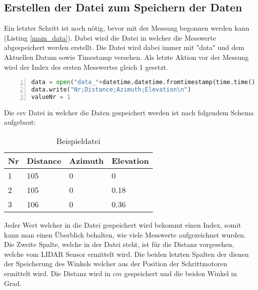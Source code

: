 \subsection{Erstellen der Datei zum Speichern der Daten}
Ein letzter Schritt ist noch nötig, bevor mit der Messung begonnen werden kann (Listing \ref{main_data}). Dabei wird die Datei in welcher die Messwerte abgespeichert werden erstellt. Die Datei wird dabei immer mit "data" und dem Aktuellen Datum sowie Timestamp versehen. Als letzte Aktion vor der Messung wird der Index des ersten Messwertes gleich 1 gesetzt.\\
\begin{lstlisting}[caption={Erstellen der Datei zum Speichern der Daten}, language={Python}, label={main_data}, numbers=left]
data = open("data_"+datetime.datetime.fromtimestamp(time.time()).strftime('%Y-%m-%d_%H-%M-%S')+".csv", "w")
data.write("Nr;Distance;Azimuth;Elevation\n")
valueNr = 1
\end{lstlisting}
Die \ac{csv} Datei in welcher die Daten gespeichert werden ist nach folgendem Schema aufgebaut:
\begin{table}[H]
	\centering
	\caption{Beispieldatei}
	\begin{tabular}{|l|l|l|l|}
		\hline
		\textbf{Nr} & \textbf{Distance} & \textbf{Azimuth} & \textbf{Elevation} \\\hline
		1  & 105      & 0       & 0         \\\hline
		2  & 105      & 0       & 0.18      \\\hline
		3  & 106      & 0       & 0.36      \\\hline
	\end{tabular}
\end{table}
Jeder Wert welcher in die Datei gespeichert wird bekommt einen Index, somit kann man einen Überblick behalten, wie viele Messwerte aufgezeichnet wurden. Die Zweite Spalte, welche in der Datei steht, ist für die Distanz vorgesehen, welche vom \ac{LIDAR} Sensor ermittelt wird. Die beiden letzten Spalten der dienen der Speicherung des Winkels welcher aus der Position der Schrittmotoren ermittelt wird. Die Distanz wird in $cm$ gespeichert und die beiden Winkel in Grad.

